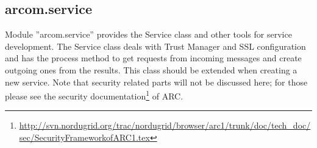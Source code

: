 \documentclass{article}
\begin{document}
\subsection{arcom.service}
\label{aservice}
Module ''arcom.service'' provides the Service class and other tools for
service development. The Service class deals with Trust Manager
and SSL configuration and has the process method to get requests from 
incoming messages and create outgoing ones from the results.
This class should be extended when creating a new service.
Note that security related parts will not be discussed here; for those please see 
the security documentation\footnote{\url{http://svn.nordugrid.org/trac/nordugrid/browser/arc1/trunk/doc/tech\_doc/sec/SecurityFrameworkofARC1.tex}} 
of ARC.
\begin{flushleft}


\end{flushleft}
\end{document}
